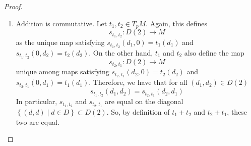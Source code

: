 \begin{proof}
  \begin{enumerate}
    \item Addition is commutative. Let \( t_1,t_2\in T_pM \). Again, this defines
      \begin{equation*}
	s_{t_1,t_2}:D(2)\to M
      \end{equation*}
      as the unique map satisfying \( s_{t_1,t_2}(d_1,0) = t_1(d_1) \) and \( s_{t_1,t_2}(0,d_2) = t_2(d_2) \). On the other hand, \( t_1 \) and \( t_2 \) also define the map
      \begin{equation*}
	s_{t_2,t_1}:D(2)\to M
      \end{equation*}
      unique among maps satisfying \( s_{t_2,t_1}(d_2,0) = t_2(d_2) \) and \( s_{t_2,t_1}(0,d_1) = t_1(d_1) \). Therefore, we have that for all \( (d_1,d_2)\in D(2) \)
      \begin{equation*}
	s_{t_1,t_2}(d_1,d_2) = s_{t_2,t_1}(d_2,d_1)
      \end{equation*}
      In particular, \( s_{t_1,t_2} \) and \( s_{t_2,t_1} \) are equal on the diagonal \( \left\{ (d,d)\mid d\in D \right\}\subset D(2) \). So, by definition of \( t_1+t_2 \) and \( t_2+t_1 \), these two are equal.


\end{enumerate}
\end{proof}
